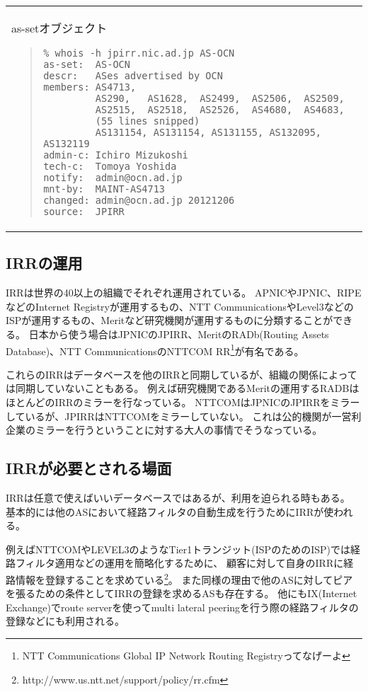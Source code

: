 \begin{tabular}{l}
\begin{itembox}[c]{as-setオブジェクト}
\begin{quote}
\begin{minilinespace}
\begin{verbatim}
% whois -h jpirr.nic.ad.jp AS-OCN
as-set:  AS-OCN
descr:   ASes advertised by OCN
members: AS4713,
         AS290,   AS1628,  AS2499,  AS2506,  AS2509,
         AS2515,  AS2518,  AS2526,  AS4680,  AS4683,
         (55 lines snipped)
         AS131154, AS131154, AS131155, AS132095, AS132119
admin-c: Ichiro Mizukoshi
tech-c:  Tomoya Yoshida
notify:  admin@ocn.ad.jp
mnt-by:  MAINT-AS4713
changed: admin@ocn.ad.jp 20121206
source:  JPIRR
\end{verbatim}
\end{minilinespace}
\end{quote}
\end{itembox}

\end{tabular}

\newpage
\subsection{IRRの運用}

IRRは世界の40以上の組織でそれぞれ運用されている。
APNICやJPNIC、RIPEなどのInternet Registryが運用するもの、NTT CommunicationsやLevel3などのISPが運用するもの、Meritなど研究機関が運用するものに分類することができる。
日本から使う場合はJPNICのJPIRR、MeritのRADb(Routing Assets Database)、NTT CommunicationsのNTTCOM RR\footnote{NTT Communications Global IP Network Routing Registryってなげーよ}が有名である。

これらのIRRはデータベースを他のIRRと同期しているが、組織の関係によっては同期していないこともある。
例えば研究機関であるMeritの運用するRADBはほとんどのIRRのミラーを行なっている。
NTTCOMはJPNICのJPIRRをミラーしているが、JPIRRはNTTCOMをミラーしていない。
これは公的機関が一営利企業のミラーを行うということに対する大人の事情でそうなっている。

\subsection{IRRが必要とされる場面}

IRRは任意で使えばいいデータベースではあるが、利用を迫られる時もある。
基本的には他のASにおいて経路フィルタの自動生成を行うためにIRRが使われる。

例えばNTTCOMやLEVEL3のようなTier1トランジット(ISPのためのISP)では経路フィルタ適用などの運用を簡略化するために、
顧客に対して自身のIRRに経路情報を登録することを求めている\footnote{http://www.us.ntt.net/support/policy/rr.cfm}。
また同様の理由で他のASに対してピアを張るための条件としてIRRの登録を求めるASも存在する。
他にもIX(Internet Exchange)でroute serverを使ってmulti lateral peeringを行う際の経路フィルタの登録などにも利用される。

